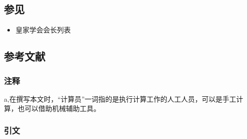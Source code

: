 \subsection{参见}
\begin{itemize}
\item 皇家学会会长列表
\end{itemize}
\subsection{参考文献}
\subsubsection{注释}
a,在撰写本文时，“计算员”一词指的是执行计算工作的人工人员，可以是手工计算，也可以借助机械辅助工具。
\subsubsection{引文}

